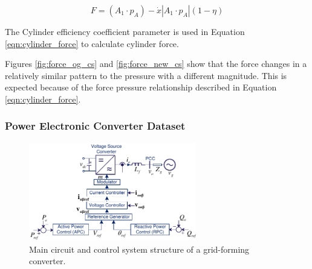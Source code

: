 
\begin{equation}
    \label{eqn:cylinder_force}
    F = (A_1 \cdot p_A) - \dot{x}  | A_1 \cdot p_A | (1 - \eta)
\end{equation}

The Cylinder efficiency coefficient parameter is used in Equation \ref{eqn:cylinder_force} to calculate cylinder force.

Figures \ref{fig:force_og_cs} and \ref{fig:force_new_cs} show that the force changes in a relatively similar pattern to the pressure with a different magnitude. This is expected because of the force pressure relationship described in Equation \ref{eqn:cylinder_force}.

\subsubsection{Power Electronic Converter Dataset}
\label{ref_pec_dataset}

 \begin{figure}[H]
	\includegraphics[width=0.65\textwidth]{Images/GFMSchema.pdf}
	\caption{Main circuit and control system structure of a grid-forming converter.}
	\label{fig:sys}
\end{figure}

